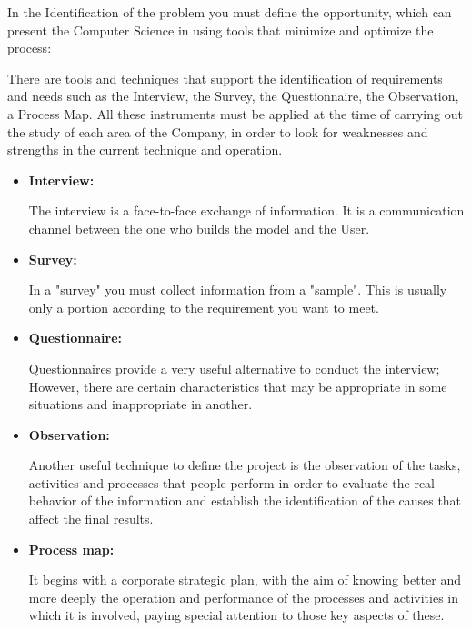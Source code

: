 \documentclass{article}
\begin{document}
\par In the Identification of the problem you must define the opportunity, which
can present the Computer Science in using tools that minimize and optimize the
process:

\par There are tools and techniques that support the identification of
requirements and needs such as the Interview, the Survey, the Questionnaire, the
Observation, a Process Map. All these instruments must be applied at the time of
carrying out the study of each area of the Company, in order to look for
weaknesses and strengths in the current technique and operation.

\begin{itemize}
	\item
	      \textbf{Interview:}
	      \par The interview is a face-to-face exchange of information. It is a
	      communication channel between the one who builds the model and the User.
	\item

	      \textbf{Survey:}
	      \par In a "survey" you must collect information from a "sample". This is
	      usually only a portion according to the requirement you want to meet.
	\item

	      \textbf{Questionnaire:}
	      \par Questionnaires provide a very useful alternative to conduct the
	      interview; However, there are certain characteristics that may be
	      appropriate in some situations and inappropriate in another.

	\item
	      \textbf{Observation:}
	      \par Another useful technique to define the project is the observation
	      of the tasks, activities and processes that people perform in order to
	      evaluate the real behavior of the information and establish the
	      identification of the causes that affect the final results.

	\item
	      \textbf{Process map:}
	      \par It begins with a corporate strategic plan, with the aim of knowing
	      better and more deeply the operation and performance of the processes
	      and activities in which it is involved, paying special attention to
	      those key aspects of these.
\end{itemize}
\end{document}
